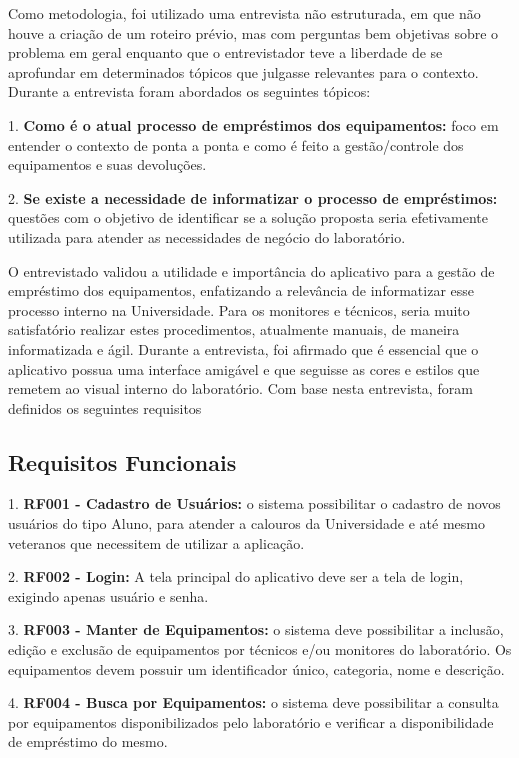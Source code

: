     Como metodologia, foi utilizado uma entrevista não estruturada, em que não houve a criação de um roteiro prévio, mas com perguntas bem objetivas sobre o problema em geral enquanto que o entrevistador teve a liberdade de se aprofundar em determinados tópicos que julgasse relevantes para o contexto. Durante a entrevista foram abordados os seguintes tópicos:
     
    1. \textbf{Como é o atual processo de empréstimos dos equipamentos:} foco em entender o contexto de ponta a ponta e como é feito a gestão/controle dos equipamentos e suas devoluções.
    
    2. \textbf{Se existe a necessidade de informatizar o processo de empréstimos:} questões com o objetivo de identificar se a solução proposta seria efetivamente utilizada para atender as necessidades de negócio do laboratório.
    
    O entrevistado validou a utilidade e importância do aplicativo para a gestão de empréstimo dos equipamentos, enfatizando a relevância de informatizar esse processo interno na Universidade. Para os monitores e técnicos, seria muito satisfatório realizar estes procedimentos, atualmente manuais, de maneira informatizada e ágil. Durante a entrevista, foi afirmado que é essencial que o aplicativo possua uma interface amigável e que seguisse as cores e estilos que remetem ao visual interno do laboratório. Com base nesta entrevista, foram definidos os seguintes requisitos
    
    \subsection{Requisitos Funcionais}
    
    1. \textbf{RF001 - Cadastro de Usuários:} o sistema possibilitar o cadastro de novos usuários do tipo Aluno, para atender a calouros da Universidade e até mesmo veteranos que necessitem de utilizar a aplicação.
    
    2. \textbf{RF002 - Login:} A tela principal do aplicativo deve ser a tela de login, exigindo apenas usuário e senha.
    
    3. \textbf{RF003 - Manter de Equipamentos:} o sistema deve possibilitar a inclusão, edição  e exclusão de equipamentos por técnicos e/ou monitores do laboratório. Os equipamentos devem possuir um identificador único, categoria, nome e descrição.
    
    4. \textbf{RF004 - Busca por Equipamentos:} o sistema deve possibilitar a consulta por equipamentos disponibilizados pelo laboratório e verificar a disponibilidade de empréstimo do mesmo.
    
